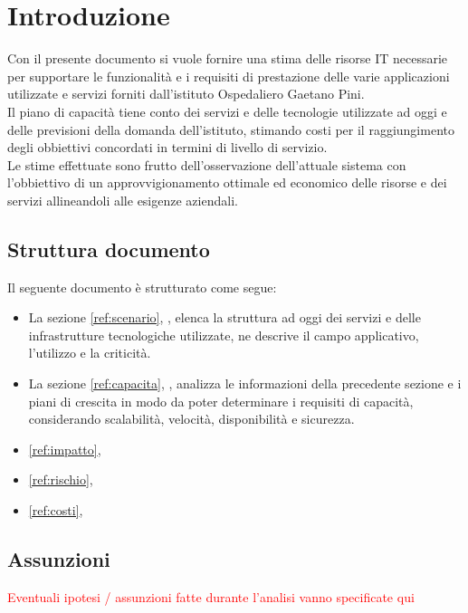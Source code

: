 \newpage

\section{Introduzione} \label{intro}
	Con il presente documento si vuole fornire una stima delle risorse IT necessarie per supportare le funzionalità e i requisiti di prestazione delle varie applicazioni utilizzate e servizi forniti dall'istituto  Ospedaliero Gaetano Pini.\\
	Il piano di capacità tiene conto dei servizi e delle tecnologie utilizzate ad oggi e delle previsioni della domanda dell'istituto, stimando costi per il raggiungimento degli obbiettivi concordati in termini di livello di servizio. \\
	Le stime effettuate sono frutto dell'osservazione dell'attuale sistema con l'obbiettivo di un approvvigionamento ottimale ed economico delle risorse e dei servizi allineandoli alle esigenze aziendali.
	
	\subsection{Struttura documento}
	Il seguente documento è strutturato come segue:
	\begin{itemize}
		\item La sezione \ref{ref:scenario}, , elenca la struttura ad oggi dei servizi e delle infrastrutture tecnologiche utilizzate, ne descrive il campo applicativo, l'utilizzo e la criticità.
		\item La sezione \ref{ref:capacita}, , analizza le informazioni della precedente sezione e i piani di crescita in modo da poter determinare i requisiti di capacità, considerando scalabilità, velocità, disponibilità e sicurezza.
		\item  \ref{ref:impatto}, 
		\item \ref{ref:rischio}, 
		\item \ref{ref:costi}, 
	\end{itemize}
	\subsection{Assunzioni}
	\textcolor{red}{Eventuali ipotesi / assunzioni fatte durante l'analisi vanno specificate qui}